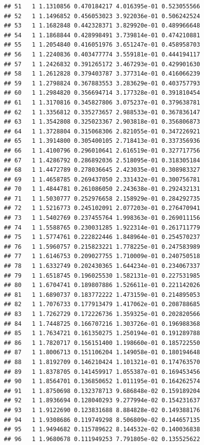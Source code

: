 \documentclass[article]{jss}\usepackage[]{graphicx}\usepackage[]{xcolor}
\makeatletter
\newenvironment{kframe}{%
 \def\at@end@of@kframe{}%
 \ifinner\ifhmode%
  \def\at@end@of@kframe{\end{minipage}}%
  \begin{minipage}{\columnwidth}%
 \fi\fi%
 \def\FrameCommand##1{\hskip\@totalleftmargin \hskip-\fboxsep
 \colorbox{shadecolor}{##1}\hskip-\fboxsep
     \hskip-\linewidth \hskip-\@totalleftmargin \hskip\columnwidth}%
 \MakeFramed {\advance\hsize-\width
   \@totalleftmargin\z@ \linewidth\hsize
   \@setminipage}}%
 {\par\unskip\endMakeFramed%
 \at@end@of@kframe}
\newenvironment{knitrout}{}{} %
\makeatother
\begin{document}
\begin{knitrout}
\begin{kframe}
\begin{verbatim}
## 51   1 1.1310856 0.470184217 4.016395e-01 0.523055566
## 52   1 1.1496852 0.456053023 3.922036e-01 0.506242524
## 53   1 1.1682848 0.442328371 3.829920e-01 0.489966648
## 54   1 1.1868844 0.428998491 3.739814e-01 0.474210881
## 55   1 1.2054840 0.416051976 3.651247e-01 0.458958703
## 56   1 1.2240836 0.403477774 3.559181e-01 0.444194117
## 57   1 1.2426832 0.391265172 3.467293e-01 0.429901630
## 58   1 1.2612828 0.379403787 3.377314e-01 0.416066239
## 59   1 1.2798824 0.367883553 3.283629e-01 0.403757793
## 60   1 1.2984820 0.356694714 3.177328e-01 0.391810454
## 61   1 1.3170816 0.345827806 3.075237e-01 0.379638781
## 62   1 1.3356812 0.335273657 2.988533e-01 0.367836147
## 63   1 1.3542808 0.325023367 2.903818e-01 0.356806873
## 64   1 1.3728804 0.315068306 2.821055e-01 0.347226921
## 65   1 1.3914800 0.305400105 2.718413e-01 0.337356936
## 66   1 1.4100796 0.296010641 2.616519e-01 0.327717756
## 67   1 1.4286792 0.286892036 2.518095e-01 0.318305184
## 68   1 1.4472789 0.278036645 2.423035e-01 0.308983327
## 69   1 1.4658785 0.269437050 2.331432e-01 0.300756781
## 70   1 1.4844781 0.261086050 2.243638e-01 0.292432131
## 71   1 1.5030777 0.252976658 2.158929e-01 0.284292735
## 72   1 1.5216773 0.245102091 2.077203e-01 0.276470941
## 73   1 1.5402769 0.237455764 1.998363e-01 0.269011156
## 74   1 1.5588765 0.230031285 1.922314e-01 0.261711779
## 75   1 1.5774761 0.222822446 1.848964e-01 0.254570237
## 76   1 1.5960757 0.215823221 1.778225e-01 0.247583989
## 77   1 1.6146753 0.209027755 1.710009e-01 0.240750518
## 78   1 1.6332749 0.202430365 1.644234e-01 0.234067337
## 79   1 1.6518745 0.196025530 1.582131e-01 0.227531985
## 80   1 1.6704741 0.189807886 1.526611e-01 0.221142026
## 81   1 1.6890737 0.183772222 1.473159e-01 0.214895053
## 82   1 1.7076733 0.177913479 1.417062e-01 0.208788685
## 83   1 1.7262729 0.172226736 1.359325e-01 0.202820566
## 84   1 1.7448725 0.166707216 1.303726e-01 0.196988368
## 85   1 1.7634721 0.161350275 1.250194e-01 0.191289788
## 86   1 1.7820717 0.156151400 1.198660e-01 0.185722550
## 87   1 1.8006713 0.151106204 1.149058e-01 0.180194648
## 88   1 1.8192709 0.146210424 1.101321e-01 0.174763570
## 89   1 1.8378705 0.141459917 1.055387e-01 0.169453456
## 90   1 1.8564701 0.136850652 1.011195e-01 0.164262574
## 91   1 1.8750698 0.132378713 9.686848e-02 0.159189204
## 92   1 1.8936694 0.128040293 9.277994e-02 0.154231637
## 93   1 1.9122690 0.123831688 8.884828e-02 0.149388176
## 94   1 1.9308686 0.119749298 8.506809e-02 0.144657135
## 95   1 1.9494682 0.115789622 8.144532e-02 0.140036838
## 96   1 1.9680678 0.111949253 7.791805e-02 0.135525622

\end{verbatim}
\end{kframe}
\end{knitrout}
\end{document}
